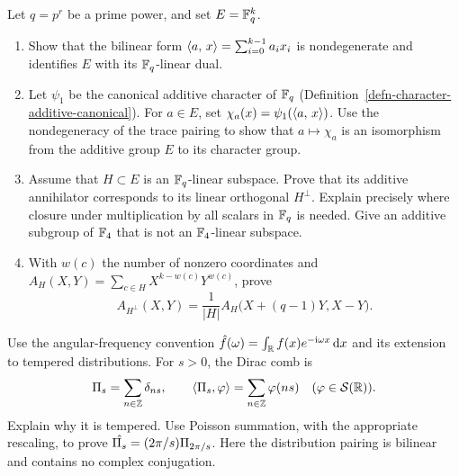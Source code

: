 \begin{exo}
\label{exo-generalization-mac-williams}
Let $q=p^r$ be a prime power, and set $E=\mathbb{F}_q^k$.
\begin{enumerate}
\item Show that the bilinear form
$\langle a,\,x\rangle=\sum_{i=0}^{k-1}a_ix_i$ is nondegenerate and identifies $E$ with
its $\mathbb{F}_q$-linear dual.
\item Let $\psi_1$ be the canonical additive character of $\mathbb{F}_q$
(Definition~\ref{defn-character-additive-canonical}).
For $a\in E$, set $\chi_a(x)=\psi_1(\langle a,\,x\rangle)$.
Use the nondegeneracy of the trace pairing to show that $a\mapsto\chi_a$
is an isomorphism from the additive group $E$ to its character group.
\item Assume that $H\subset E$ is an $\mathbb{F}_q$-linear subspace.
Prove that its additive annihilator corresponds to its linear orthogonal
$H^\perp$. Explain precisely where closure under multiplication by all
scalars in $\mathbb{F}_q$ is needed. Give an additive subgroup of $\mathbb{F}_4$ that
is not an $\mathbb{F}_4$-linear subspace.
\item With $w(c)$ the number of nonzero coordinates and
$A_H(X,Y)=\sum_{c\in H}X^{k-w(c)}Y^{w(c)}$, prove
\[
 A_{H^\perp}(X,Y)=\frac1{|H|}A_H\bigl(X+(q-1)Y,X-Y\bigr).
\]
\end{enumerate}
\end{exo}


\begin{exo}
\label{exo-formula-fish-distrib}\label{notation-41}
Use the angular-frequency convention
$\hat{f}(\omega)=\int_{\mathbb{R}}f(x)e^{-\mathrm{i}\omega x}\,\mathrm{d} x$ and its extension
to tempered distributions. For $s>0$, the Dirac comb is
\begin{equation}
\label{eq-trans-fourier-comb-dirac}
 \Pi_s=\sum_{n\in\mathbb{Z}}\delta_{ns},\qquad
 \langle\Pi_s,\varphi\rangle=\sum_{n\in\mathbb{Z}}\varphi(ns)
 \quad(\varphi\in\mathcal{S}(\mathbb{R})).
\end{equation}
Explain why it is tempered. Use Poisson summation, with the appropriate
rescaling, to prove $\hat{\Pi_s}=(2\pi/s)\Pi_{2\pi/s}$.
Here the distribution pairing is bilinear and contains no complex conjugation.
\end{exo}

